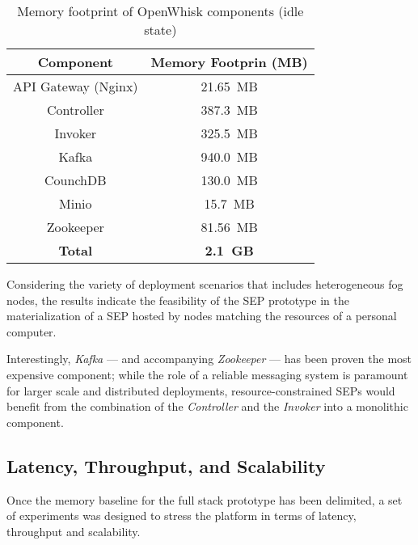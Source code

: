 \begin{table}[tbp]
\renewcommand{\arraystretch}{1.3}
\caption{Memory footprint of OpenWhisk components (idle state)}
\label{tab:OPENWHISK_MEM_FOOTPRINT}
\centering
\begin{tabular}{|c|c|}
\hline
\textbf{Component} & \textbf{Memory Footprin (MB)}\\
\hline
API Gateway (Nginx) & 21.65~MB\\
\hline
Controller          & 387.3~MB\\
\hline
Invoker             & 325.5~MB\\
\hline
Kafka               & 940.0~MB\\
\hline
CounchDB            & 130.0~MB\\
\hline
Minio               & 15.7~MB\\
\hline
Zookeeper           & 81.56~MB\\
\hline
\textbf{Total}      & \textbf{2.1~GB}\\
\hline
\end{tabular}
\end{table}

Considering the variety of deployment scenarios that includes heterogeneous fog nodes, the results indicate the feasibility of the SEP prototype in the materialization of a SEP hosted by nodes matching the resources of a personal computer. 

Interestingly, \textit{Kafka} --- and accompanying \textit{Zookeeper} --- has been proven the most expensive component; while the role of a reliable messaging system is paramount for larger scale and distributed deployments, resource-constrained SEPs would benefit from the combination of the \textit{Controller} and the \textit{Invoker} into a monolithic component.

\subsection{Latency, Throughput, and Scalability}

Once the memory baseline for the full stack prototype has been delimited, a set of experiments was designed to stress the platform in terms of latency, throughput and scalability.

